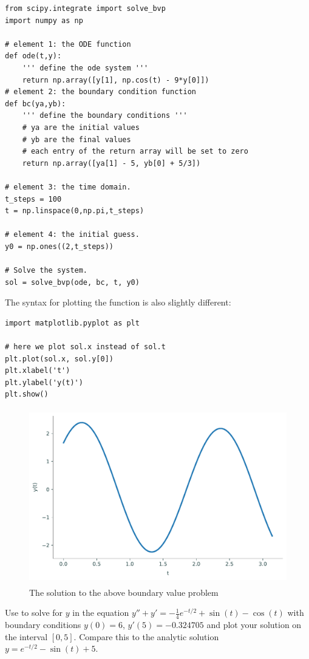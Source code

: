 \begin{lstlisting}
from scipy.integrate import solve_bvp
import numpy as np

# element 1: the ODE function
def ode(t,y):
    ''' define the ode system '''
    return np.array([y[1], np.cos(t) - 9*y[0]])
# element 2: the boundary condition function
def bc(ya,yb):
    ''' define the boundary conditions '''
    # ya are the initial values
    # yb are the final values
    # each entry of the return array will be set to zero
    return np.array([ya[1] - 5, yb[0] + 5/3])

# element 3: the time domain.
t_steps = 100
t = np.linspace(0,np.pi,t_steps)

# element 4: the initial guess.
y0 = np.ones((2,t_steps))

# Solve the system.
sol = solve_bvp(ode, bc, t, y0)
\end{lstlisting}
%
The syntax for plotting the function is also slightly different:
\begin{lstlisting}
import matplotlib.pyplot as plt

# here we plot sol.x instead of sol.t
plt.plot(sol.x, sol.y[0])
plt.xlabel('t')
plt.ylabel('y(t)')
plt.show()
\end{lstlisting}

\begin{figure}[H]
    \centering
    \includegraphics[height=3in]{figures/fig3.pdf}
    \caption{The solution to the above boundary value problem}
\end{figure}

\begin{problem}
    \label{prob:bvpintro:bvp2}
    Use  to solve for $y$ in the equation $y'' + y' = -\frac{1}{4}e^{-t/2}+\sin(t)-\cos(t)$ with boundary conditions $y(0)= 6$, $y'(5) = -0.324705$ and plot your solution on the interval $[0,5]$. Compare this to the analytic solution $y=e^{-t/2}-\sin(t)+5$.
\end{problem}


